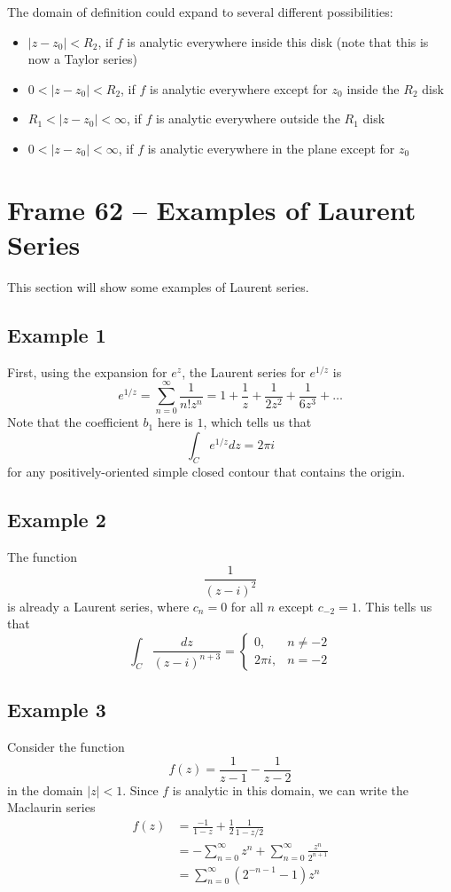 \documentclass{article}
\begin{document}
The domain of definition could expand to several different possibilities:
\begin{itemize}
	\item $|z - z_0| < R_2$, if $f$ is analytic everywhere inside this disk (note that this is now a Taylor series)
	
	\item $0 < |z - z_0| < R_2$, if $f$ is analytic everywhere except for $z_0$ inside the $R_2$ disk
	
	\item $R_1 < |z - z_0| < \infty$, if $f$ is analytic everywhere outside the $R_1$ disk
	
	\item $0 < |z - z_0| < \infty$, if $f$ is analytic everywhere in the plane except for $z_0$
\end{itemize}


\clearpage
\section{Frame 62 -- Examples of Laurent Series}
This section will show some examples of Laurent series.

\subsection{Example 1}
First, using the expansion for $e^z$, the Laurent series for $e^{1/z}$ is
\[
	e^{1/z} = \sum_{n=0}^\infty \frac{1}{n! z^n}
	= 1 + \frac{1}{z} + \frac{1}{2z^2} + \frac{1}{6z^3} + \dots
\]
Note that the coefficient $b_1$ here is $1$, which tells us that
\[
	\int_C e^{1/z} dz = 2\pi i
\]
for any positively-oriented simple closed contour that contains the origin.

\subsection{Example 2}
The function
\[
	\frac{1}{(z - i)^2}
\]
is already a Laurent series, where $c_n = 0$ for all $n$ except $c_{-2} = 1$. This tells us that
\[
	\int_C \frac{dz}{(z - i)^{n+3}} = \begin{cases}
		0,		& n \ne -2 \\
		2\pi i, & n   = -2
	\end{cases}
\]

\subsection{Example 3}
Consider the function
\[
	f(z) = \frac{1}{z - 1} - \frac{1}{z - 2}
\]
in the domain $|z| < 1$. Since $f$ is analytic in this domain, we can write the Maclaurin series
\begin{align*}
	f(z) 
	&= \frac{-1}{1 - z} + \frac{1}{2} \frac{1}{1 - z/2} \\
	&= -\sum_{n=0}^\infty z^n + \sum_{n=0}^\infty \frac{z^n}{2^{n+1}} \\
	&= \sum_{n=0}^\infty (2^{-n-1} - 1) z^n 
\end{align*}
\end{document}
